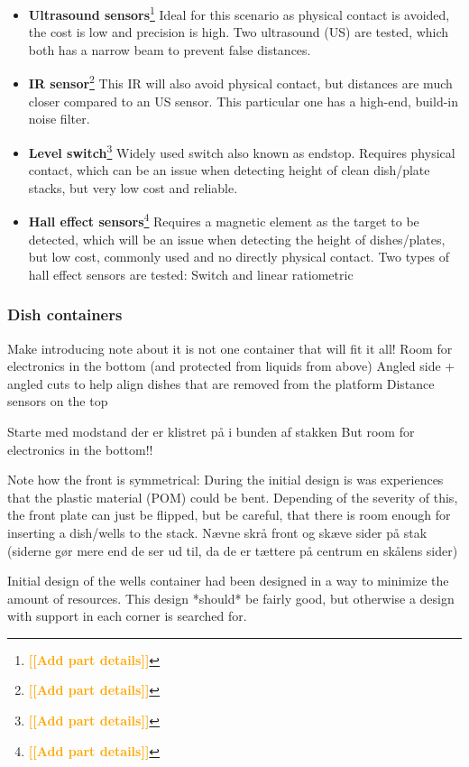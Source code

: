 \documentclass{sigchi}
\newcommand{\todo}[1]{\textsf{\textbf{\textcolor{Orange}{[[#1]]}}}}
\begin{document}
	\begin{itemize}
	\item \textbf{Ultrasound sensors}\footnote{\todo{Add part details}} Ideal for this scenario as physical contact is avoided, the cost is low and precision is high. Two ultrasound (US) are tested, which both has a narrow beam to prevent false distances.
	\item \textbf{IR sensor}\footnote{\todo{Add part details}} This IR will also avoid physical contact, but distances are much closer compared to an US sensor. This particular one has a high-end, build-in noise filter.
	\item \textbf{Level switch}\footnote{\todo{Add part details}} Widely used switch also known as endstop. Requires physical contact, which can be an issue when detecting height of clean dish/plate stacks, but very low cost and reliable.
	\item \textbf{Hall effect sensors}\footnote{\todo{Add part details}} Requires a magnetic element as the target to be detected, which will be an issue when detecting the height of dishes/plates, but low cost, commonly used and no directly physical contact. Two types of hall effect sensors are tested: Switch and linear ratiometric
	\end{itemize}
		
				
	\subsubsection{Dish containers}\label{subsubsec:Initial_DishContainers}
	Make introducing note about it is not one container that will fit it all!
		Room for electronics in the bottom (and protected from liquids from above)
		Angled side + angled cuts to help align dishes that are removed from the platform
		Distance sensors on the top
		
		Starte med modstand der er klistret på i bunden af stakken
			But room for electronics in the bottom!!
			
		Note how the front is symmetrical: During the initial design is was experiences that the plastic material (POM) could be bent. Depending of the severity of this, the front plate can just be flipped, but be careful, that there is room enough for inserting a dish/wells to the stack.
		Nævne skrå front og skæve sider på stak (siderne gør mere end de ser ud til, da de er tættere på centrum en skålens sider)
			
		
		Initial design of the wells container had been designed in a way to minimize the amount of resources. This design *should* be fairly good, but otherwise a design with support in each corner is searched for.
	
\end{document}
